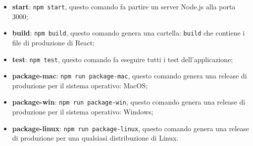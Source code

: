 \begin{itemize}
\begin{itemize}
            \item \textbf{start}: \verb|npm start|, questo comando fa partire un server Node.js alla porta 3000;
            \item \textbf{build}: \verb|npm build|, questo comando genera una cartella: \verb|build| che contiene i file di produzione di React;
            \item \textbf{test}: \verb|npm test|, questo comando fa eseguire tutti i test dell'applicazione;
            \item \textbf{package-mac}: \verb|npm run package-mac|, questo comando genera una release di produzione per il sistema operativo: MacOS;
            \item \textbf{package-win}: \verb|npm run package-win|, questo comando genera una release di produzione per il sistema operativo: Windows;
            \item \textbf{package-linux}: \verb|npm run package-linux|, questo comando genera una release di produzione per una qualsiasi distribuzione di Linux.
        \end{itemize}
\end{itemize}
